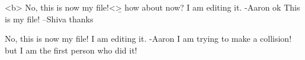 <b> No, this is now my file!<\b>
how about now?
I am editing it. -Aaron ok
This is my file! --Shiva thanks

No, this is now my file!
I am editing it. -Aaron
I am trying to make a collision! but I am the first person who did it!

